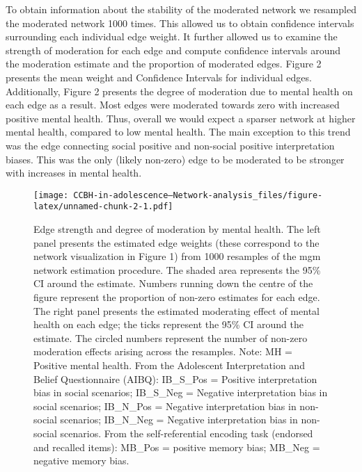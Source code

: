 \documentclass[
  english,
  man]{apa6}
\begin{document}
To obtain information about the stability of the moderated network we resampled the moderated network 1000 times. This allowed us to obtain confidence intervals surrounding each individual edge weight. It further allowed us to examine the strength of moderation for each edge and compute confidence intervals around the moderation estimate and the proportion of moderated edges. Figure 2 presents the mean weight and Confidence Intervals for individual edges. Additionally, Figure 2 presents the degree of moderation due to mental health on each edge as a result. Most edges were moderated towards zero with increased positive mental health. Thus, overall we would expect a sparser network at higher mental health, compared to low mental health. The main exception to this trend was the edge connecting social positive and non-social positive interpretation biases. This was the only (likely non-zero) edge to be moderated to be stronger with increases in mental health.

\begin{figure}
\centering
\texttt{[image: CCBH-in-adolescence---Network-analysis\_files/figure-latex/unnamed-chunk-2-1.pdf]}
\caption{\label{fig:unnamed-chunk-2}Edge strength and degree of moderation by mental health. The left panel presents the estimated edge weights (these correspond to the network visualization in Figure 1) from 1000 resamples of the mgm network estimation procedure. The shaded area represents the 95\% CI around the estimate. Numbers running down the centre of the figure represent the proportion of non-zero estimates for each edge. The right panel presents the estimated moderating effect of mental health on each edge; the ticks represent the 95\% CI around the estimate. The circled numbers represent the number of non-zero moderation effects arising across the resamples. Note: MH = Positive mental health. From the Adolescent Interpretation and Belief Questionnaire (AIBQ): IB\_S\_Pos = Positive interpretation bias in social scenarios; IB\_S\_Neg = Negative interpretation bias in social scenarios; IB\_N\_Pos = Negative interpretation bias in non-social scenarios; IB\_N\_Neg = Negative interpretation bias in non-social scenarios. From the self-referential encoding task (endorsed and recalled items): MB\_Pos = positive memory bias; MB\_Neg = negative memory bias.}
\end{figure}
\end{document}
